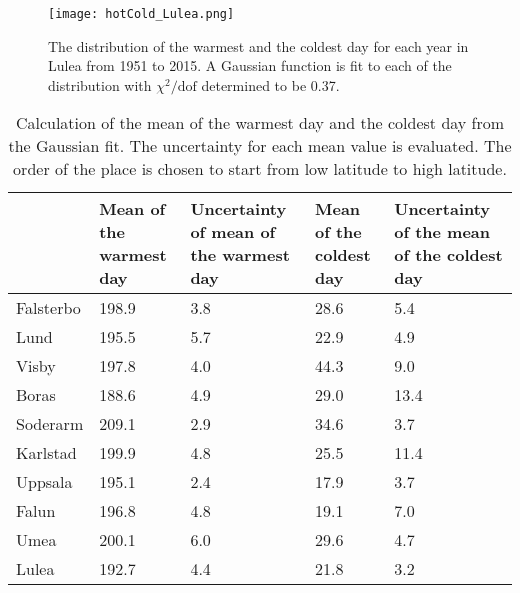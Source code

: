 \begin{figure}[H]
\centering
\texttt{[image: hotCold\_Lulea.png]}
\caption{The distribution of the warmest and the coldest day for each year in Lulea from 1951 to 2015. A Gaussian function is fit to each of the distribution with $\chi^2/\text{dof}$ determined to be 0.37.}
\label{hotColdLulea}
\end{figure}

\begin{table}[H]
\centering
\begin{tabular}{p{1.7cm} p{2.0cm} p{2.2cm} p{2.0cm} p{2.3cm}}
\hline
  & Mean of the warmest day & Uncertainty of mean of the warmest day & Mean of the coldest day & Uncertainty of the mean of the coldest day \\ \hline \hline
Falsterbo & 198.9                   & 3.8                                    & 28.6                    & 5.4                                        \\ \hline
Lund      & 195.5                   & 5.7                                    & 22.9                    & 4.9                                        \\ \hline
Visby     & 197.8                   & 4.0                                    & 44.3                    & 9.0                                        \\ \hline
Boras     & 188.6                   & 4.9                                    & 29.0                    & 13.4                                       \\ \hline
Soderarm  & 209.1                   & 2.9                                    & 34.6                    & 3.7                                        \\ \hline
Karlstad  & 199.9                   & 4.8                                    & 25.5                    & 11.4                                       \\ \hline
Uppsala   & 195.1                   & 2.4                                    & 17.9                    & 3.7                                        \\ \hline
Falun     & 196.8                   & 4.8                                    & 19.1                    & 7.0                                        \\ \hline
Umea      & 200.1                   & 6.0                                    & 29.6                    & 4.7                                        \\ \hline
Lulea     & 192.7                   & 4.4                                    & 21.8                    & 3.2                                        \\ \hline
\end{tabular}
\caption{Calculation of the mean of the warmest day and the coldest day from the Gaussian fit. The uncertainty for each mean value is evaluated. The order of the place is chosen to start from low latitude to high latitude. }
\label{hotColdResult}
\end{table}


